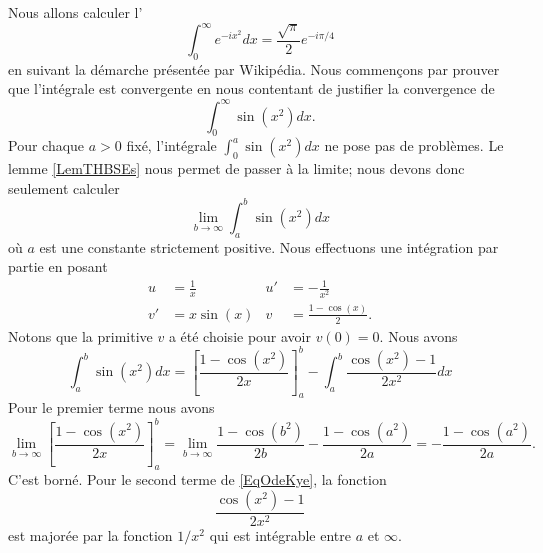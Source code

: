 Nous allons calculer l'
\begin{equation}
	\int_0^{\infty} e^{-ix^2}dx=\frac{ \sqrt{\pi} }{ 2 } e^{-i\pi/4}
\end{equation}
en suivant la démarche présentée par Wikipédia\cite{ooOXWGooGhLJvX}. Nous commençons par prouver que l'intégrale est convergente en nous contentant de justifier la convergence de
\begin{equation}
	\int_0^{\infty}\sin(x^2)dx.
\end{equation}
Pour chaque \( a>0\) fixé, l'intégrale \( \int_0^a\sin(x^2)dx\) ne pose pas de problèmes. Le lemme \ref{LemTHBSEs} nous permet de passer à la limite; nous devons donc seulement calculer
\begin{equation}
	\lim_{b\to \infty}\int_a^b\sin(x^2)dx
\end{equation}
où \( a\) est une constante strictement positive. Nous effectuons une intégration par partie en posant
\begin{subequations}
	\begin{align}
		u  & =\frac{1}{ x } & u' & =-\frac{1}{ x^2 }       \\
		v' & =x\sin(x)      & v  & =\frac{ 1-\cos(x) }{2}.
	\end{align}
\end{subequations}
Notons que la primitive \( v\) a été choisie pour avoir \( v(0)=0\). Nous avons
\begin{equation}    \label{EqOdeKye}
	\int_a^b\sin(x^2)dx=\left[ \frac{ 1-\cos(x^2) }{ 2x } \right]_a^b-\int_a^b\frac{ \cos(x^2)-1 }{ 2x^2 }dx
\end{equation}
Pour le premier terme nous avons
\begin{equation}
	\lim_{b\to \infty}\left[ \frac{ 1-\cos(x^2) }{ 2x } \right]_a^b=\lim_{b\to \infty}\frac{ 1-\cos(b^2) }{ 2b }-\frac{ 1-\cos(a^2) }{ 2a }=-\frac{ 1-\cos(a^2) }{ 2a }.
\end{equation}
C'est borné. Pour le second terme de \eqref{EqOdeKye}, la fonction
\begin{equation}
	\frac{ \cos(x^2)-1 }{ 2x^2 }
\end{equation}
est majorée par la fonction \( 1/x^2\) qui est intégrable entre \( a\) et \( \infty\).


